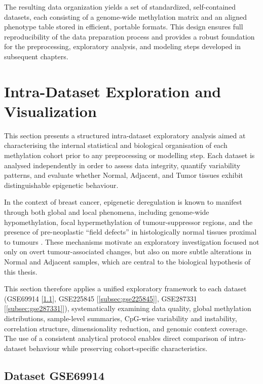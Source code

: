 The resulting data organization yields a set of standardized, self-contained datasets, each consisting of a genome-wide methylation matrix and an aligned phenotype table stored in efficient, portable formats. This design ensures full reproducibility of the data preparation process and provides a robust foundation for the preprocessing, exploratory analysis, and modeling steps developed in subsequent chapters.

\section{Intra-Dataset Exploration and Visualization}
\label{sec:intra_dataset}

This section presents a structured intra-dataset exploratory analysis aimed at characterising the internal statistical and biological organisation of each methylation cohort prior to any preprocessing or modelling step. Each dataset is analysed independently in order to assess data integrity, quantify variability patterns, and evaluate whether Normal, Adjacent, and Tumor tissues exhibit distinguishable epigenetic behaviour.

In the context of breast cancer, epigenetic deregulation is known to manifest through both global and local phenomena, including genome-wide hypomethylation, focal hypermethylation of tumour-suppressor regions, and the presence of pre-neoplastic ``field defects'' in histologically normal tissues proximal to tumours \cite{ehrlich2002, bird2002, teschendorff2016}. These mechanisms motivate an exploratory investigation focused not only on overt tumour-associated changes, but also on more subtle alterations in Normal and Adjacent samples, which are central to the biological hypothesis of this thesis.

This section therefore applies a unified exploratory framework to each dataset (GSE69914 [\ref{subsec:gse69914}], GSE225845 [\ref{subsec:gse225845}], GSE287331 [\ref{subsec:gse287331}]), systematically examining data quality, global methylation distributions, sample-level summaries, CpG-wise variability and instability, correlation structure, dimensionality reduction, and genomic context coverage. The use of a consistent analytical protocol enables direct comparison of intra-dataset behaviour while preserving cohort-specific characteristics.

\subsection{Dataset GSE69914}
\label{subsec:gse69914}


